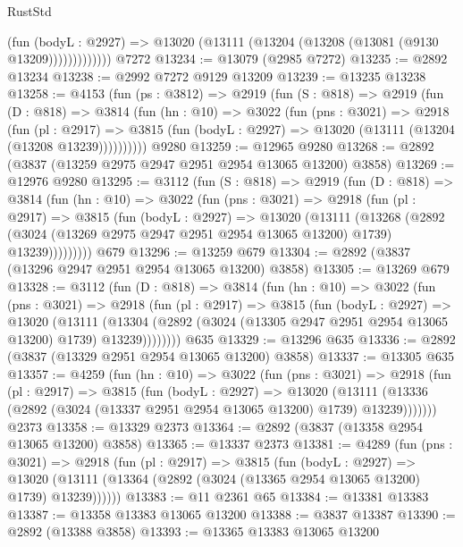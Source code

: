 \begin{lexlean}{RustStd}
\begin{coremodule}
                  (fun (bodyL : @2927) =>
                  @13020 (@13111 (@13204 (@13208 (@13081 (@9130 @13209)))))))))))))
    @7272
@13234 := @13079 (@2985 @7272)
@13235 := @2892 @13234
@13238 := @2992 @7272 @9129 @13209
@13239 := @13235 @13238
@13258 := @4153
    (fun (ps : @3812) =>
    @2919
      (fun (S : @818) =>
      @2919
        (fun (D : @818) =>
        @3814
          (fun (hn : @10) =>
          @3022
            (fun (pns : @3021) =>
            @2918
              (fun (pl : @2917) =>
              @3815 (fun (bodyL : @2927) => @13020 (@13111 (@13204 (@13208 @13239))))))))))
    @9280
@13259 := @12965 @9280
@13268 := @2892 (@3837 (@13259 @2975 @2947 @2951 @2954 @13065 @13200) @3858)
@13269 := @12976 @9280
@13295 := @3112
    (fun (S : @818) =>
    @2919
      (fun (D : @818) =>
      @3814
        (fun (hn : @10) =>
        @3022
          (fun (pns : @3021) =>
          @2918
            (fun (pl : @2917) =>
            @3815
              (fun (bodyL : @2927) =>
              @13020
                (@13111
                  (@13268
                    (@2892
                      (@3024 (@13269 @2975 @2947 @2951 @2954 @13065 @13200) @1739)
                      @13239)))))))))
    @679
@13296 := @13259 @679
@13304 := @2892 (@3837 (@13296 @2947 @2951 @2954 @13065 @13200) @3858)
@13305 := @13269 @679
@13328 := @3112
    (fun (D : @818) =>
    @3814
      (fun (hn : @10) =>
      @3022
        (fun (pns : @3021) =>
        @2918
          (fun (pl : @2917) =>
          @3815
            (fun (bodyL : @2927) =>
            @13020
              (@13111
                (@13304 (@2892 (@3024 (@13305 @2947 @2951 @2954 @13065 @13200) @1739) @13239))))))))
    @635
@13329 := @13296 @635
@13336 := @2892 (@3837 (@13329 @2951 @2954 @13065 @13200) @3858)
@13337 := @13305 @635
@13357 := @4259
    (fun (hn : @10) =>
    @3022
      (fun (pns : @3021) =>
      @2918
        (fun (pl : @2917) =>
        @3815
          (fun (bodyL : @2927) =>
          @13020
            (@13111 (@13336 (@2892 (@3024 (@13337 @2951 @2954 @13065 @13200) @1739) @13239)))))))
    @2373
@13358 := @13329 @2373
@13364 := @2892 (@3837 (@13358 @2954 @13065 @13200) @3858)
@13365 := @13337 @2373
@13381 := @4289
    (fun (pns : @3021) =>
    @2918
      (fun (pl : @2917) =>
      @3815
        (fun (bodyL : @2927) =>
        @13020 (@13111 (@13364 (@2892 (@3024 (@13365 @2954 @13065 @13200) @1739) @13239))))))
@13383 := @11 @2361 @65
@13384 := @13381 @13383
@13387 := @13358 @13383 @13065 @13200
@13388 := @3837 @13387
@13390 := @2892 (@13388 @3858)
@13393 := @13365 @13383 @13065 @13200

\end{coremodule}
\end{lexlean}
